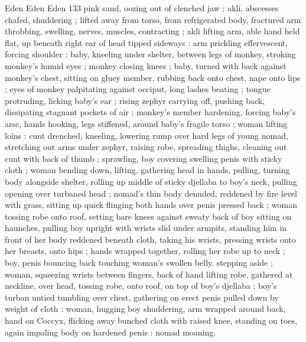 Eden Eden Eden 133
pink sand, oozing out of clenched jaw ; akli, abscesses chafed,
shuddering ; lifted away from torso, from refrigerated body, fractured
arm throbbing, swelling, nerves, muscles, contracting ; akli lifting
arm, able hand held flat, up beneath right ear of head tipped
sideways : arm prickling effervescent, forcing shoulder ; baby,
kneeling under shelter, between legs of monkey, stroking monkey's
humid eyes ; monkey closing knees ; baby, turned with back against
monkey's chest, sitting on gluey member, rubbing back onto chest,
nape onto lips ; eyes of monkey palpitating against occiput, long
lashes beating ; tongue protruding, licking baby’s ear ; rising zephyr
carrying off, pushing back, dissipating stagnant pockets of air :
monkey's member hardening, forcing baby's arse, hands hooking,
legs stiffened, around baby’s fragile torso ; woman lifting loins : cunt
drenched, kneeling, lowering rump over hard legs of young nomad,
stretching out arms under zephyr, raising robe, spreading thighs,
cleaning out cunt with back of thumb ; sprawling, boy covering
swelling penis with sticky cloth ; woman bending down, lifting,
gathering head in hands, pulling, turning body alongside shelter,
rolling up middle of sticky djellaba to boy's neck, pulling opening
over turbaned head ; nomad’s thin body denuded, reddened by fire
level with grass, sitting up quick flinging both hands over penis
pressed back ; woman tossing robe onto roof, setting bare knees
against sweaty back of boy sitting on haunches, pulling boy upright
with wrists slid under armpits, standing him in front of her body
reddened beneath cloth, taking his wrists, pressing wrists onto her
breasts, onto hips ; hands wrapped together, rolling her robe up to
neck ; boy, penis bouncing back touching woman's swollen belly.
stepping aside ; woman, squeezing wrists between fingers, back of
hand lifting robe, gathered at neckline, over head, tossing robe, onto
roof, on top of boy's djellaba ; boy's turban untied tumbling over
chest, gathering on erect penis pulled down by weight of cloth :
woman, hugging boy shuddering, arm wrapped around back, hand on
Coccyx, flicking away bunched cloth with raised knee, standing on
toes, again impaling body on hardened penis : nomad moaning.

